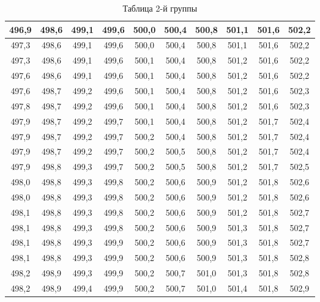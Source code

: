 \documentclass[12pt]{article}
\begin{document}
    \begin{table}[H]
        \centering
        \caption{Таблица 2-й группы}
        \begin{tabular}{|c|c|c|c|c|c|c|c|c|c|}
        \hline
        496,9 & 498,6 & 499,1 & 499,6 & 500,0 & 500,4 & 500,8  & 501,1 & 501,6  & 502,2 \\ \hline
        497,3 & 498,6 & 499,1 & 499,6 & 500,0 & 500,4 & 500,8  & 501,1 & 501,6  & 502,2 \\ \hline
        497,3 & 498,6 & 499,1 & 499,6 & 500,1 & 500,4 & 500,8  & 501,2 & 501,6  & 502,2 \\ \hline
        497,6 & 498,6 & 499,1 & 499,6 & 500,1 & 500,4 & 500,8  & 501,2 & 501,6  & 502,2 \\ \hline
        497,6 & 498,7 & 499,2 & 499,6 & 500,1 & 500,4 & 500,8  & 501,2 & 501,6  & 502,3 \\ \hline
        497,8 & 498,7 & 499,2 & 499,6 & 500,1 & 500,4 & 500,8  & 501,2 & 501,6  & 502,3 \\ \hline
        497,9 & 498,7 & 499,2 & 499,7 & 500,1 & 500,4 & 500,8  & 501,2 & 501,7  & 502,4 \\ \hline
        497,9 & 498,7 & 499,2 & 499,7 & 500,2 & 500,4 & 500,8  & 501,2 & 501,7  & 502,4 \\ \hline
        497,9 & 498,7 & 499,2 & 499,7 & 500,2 & 500,5 & 500,8  & 501,2 & 501,7  & 502,4 \\ \hline
        497,9 & 498,8 & 499,3 & 499,7 & 500,2 & 500,5 & 500,8  & 501,2 & 501,7  & 502,5 \\ \hline
        498,0 & 498,8 & 499,3 & 499,8 & 500,2 & 500,6 & 500,9  & 501,2 & 501,8  & 502,6 \\ \hline
        498,0 & 498,8 & 499,3 & 499,8 & 500,2 & 500,6 & 500,9  & 501,2 & 501,8  & 502,6 \\ \hline
        498,1 & 498,8 & 499,3 & 499,8 & 500,2 & 500,6 & 500,9  & 501,2 & 501,8  & 502,7 \\ \hline
        498,1 & 498,8 & 499,3 & 499,8 & 500,2 & 500,6 & 500,9  & 501,3 & 501,8  & 502,7 \\ \hline
        498,1 & 498,8 & 499,3 & 499,9 & 500,2 & 500,6 & 500,9  & 501,3 & 501,8  & 502,7 \\ \hline
        498,1 & 498,8 & 499,3 & 499,9 & 500,2 & 500,6 & 500,9  & 501,3 & 501,8  & 502,8 \\ \hline
        498,2 & 498,9 & 499,3 & 499,9 & 500,2 & 500,7 & 501,0  & 501,3 & 501,8  & 502,8 \\ \hline
        498,2 & 498,9 & 499,4 & 499,9 & 500,2 & 500,7 & 501,0  & 501,4 & 501,8  & 502,9 \\ \hline

\end{tabular}
\end{table}
\end{document}
